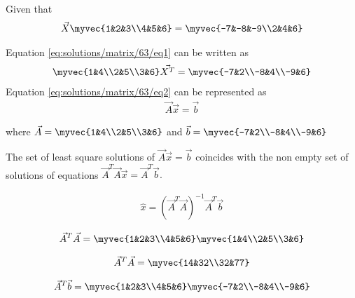 
Given that 
\begin{align}\label{eq:solutions/matrix/73/eq1}
\Vec{X}\myvec{1&2&3\\4&5&6}=\myvec{-7&-8&-9\\2&4&6}
\end{align}

Equation \eqref{eq:solutions/matrix/63/eq1} can be written as 
\begin{align}\label{eq:solutions/matrix/73/eq2}
\myvec{1&4\\2&5\\3&6}\Vec{X^T}=\myvec{-7&2\\-8&4\\-9&6}
\end{align}
Equation \eqref{eq:solutions/matrix/63/eq2} can be represented as 
\begin{align}\label{eq:solutions/matrix/73/eq3}
\vec{A}\vec{x}=\vec{b}
\end{align}

where $\vec{A}=\myvec{1&4\\2&5\\3&6}$ and $\vec{b}=\myvec{-7&2\\-8&4\\-9&6}$

The set of least square solutions of $\vec{A}\vec{x}=\vec{b}$ coincides with the non empty set of solutions of equations $\vec{A}^T\vec{A}\vec{x}=\vec{A}^T\vec{b}.$ 

\begin{align}\label{eq:solutions/matrix/73/eq4}
 \hat{x}=(\vec{A}^T\vec{A})^{-1}\vec{A}^T\vec{b} 
\end{align}

\begin{align*}
\vec{A}^T\vec{A}=\myvec{1&2&3\\4&5&6}\myvec{1&4\\2&5\\3&6}
\end{align*}

\begin{align*}
\vec{A}^T\vec{A}=\myvec{14&32\\32&77}
\end{align*}

\begin{align*}
\vec{A}^T\vec{b}=\myvec{1&2&3\\4&5&6}\myvec{-7&2\\-8&4\\-9&6}   
\end{align*}

